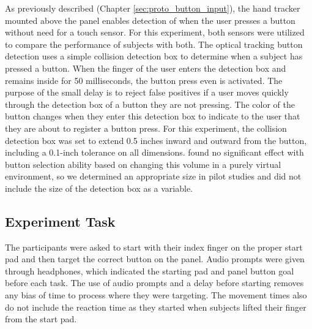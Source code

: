 As previously described (Chapter \ref{sec:proto_button_input}), the hand tracker mounted above the panel enables detection of when the user presses a button without need for a touch sensor.
For this experiment, both sensors were utilized to compare the performance of subjects with both.
The optical tracking button detection uses a simple collision detection box to determine when a subject has pressed a button.
When the finger of the user enters the detection box and remains inside for 50 milliseconds, the button press even is activated.
The purpose of the small delay is to reject false positives if a user moves quickly through the detection box of a button they are not pressing.
The color of the button changes when they enter this detection box to indicate to the user that they are about to register a button press.
For this experiment, the collision detection box was set to extend 0.5 inches inward and outward from the button, including a 0.1-inch tolerance on all dimensions.
\citet{aslandere_virtual_2015} found no significant effect with button selection ability based on changing this volume in a purely virtual environment, so we determined an appropriate size in pilot studies and did not include the size of the detection box as a variable.

\subsection{Experiment Task}

The participants were asked to start with their index finger on the proper start pad and then target the correct button on the panel.
Audio prompts were given through headphones, which indicated the starting pad and panel button goal before each task.
The use of audio prompts and a delay before starting removes any bias of time to process where they were targeting.
The movement times also do not include the reaction time as they started when subjects lifted their finger from the start pad.

